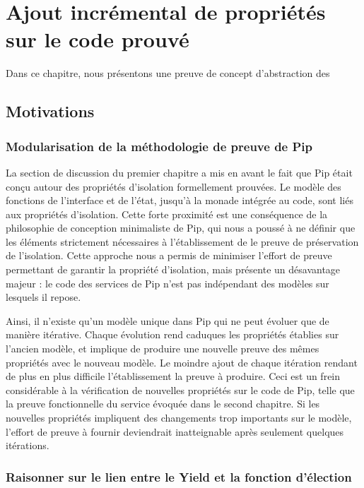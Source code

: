 \chapter{Ajout incrémental de propriétés sur le code prouvé}


	Dans ce chapitre, nous présentons une preuve de concept d'abstraction des
	\section{Motivations}
		\subsection{Modularisation de la méthodologie de preuve de Pip}
	La section de discussion du premier chapitre a mis en avant le fait que Pip était conçu autour des propriétés d'isolation formellement prouvées. Le modèle des fonctions de l'interface et de l'état, jusqu'à la monade intégrée au code, sont liés aux propriétés d'isolation. Cette forte proximité est une conséquence de la philosophie de conception minimaliste de Pip, qui nous a poussé à ne définir que les éléments strictement nécessaires à l'établissement de le preuve de préservation de l'isolation. Cette approche nous a permis de minimiser l'effort de preuve permettant de garantir la propriété d'isolation, mais présente un désavantage majeur : le code des services de Pip n'est pas indépendant des modèles sur lesquels il repose.

	Ainsi, il n'existe qu'un modèle unique dans Pip qui ne peut évoluer que de manière itérative. Chaque évolution rend caduques les propriétés établies sur l'ancien modèle, et implique de produire une nouvelle preuve des mêmes propriétés avec le nouveau modèle. Le moindre ajout de chaque itération rendant de plus en plus difficile l'établissement la preuve à produire.
	Ceci est un frein considérable à la vérification de nouvelles propriétés sur le code de Pip, telle que la preuve fonctionnelle du service évoquée dans le second chapitre. Si les nouvelles propriétés impliquent des changements trop importants sur le modèle, l'effort de preuve à fournir deviendrait inatteignable après seulement quelques itérations.

		\subsection{Raisonner sur le lien entre le Yield et la fonction d'élection}
	

